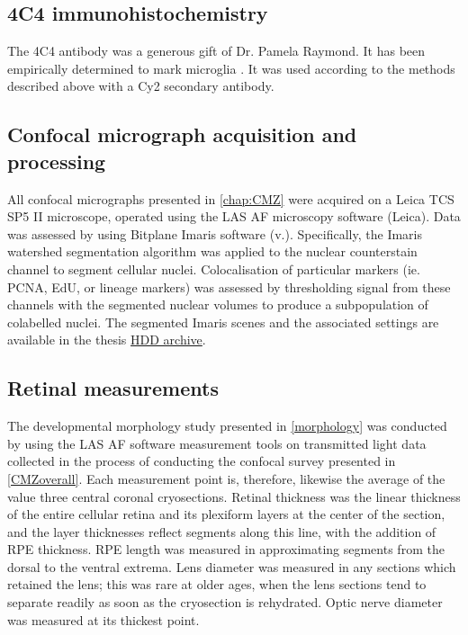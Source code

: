 \subsection{4C4 immunohistochemistry}
\label{ssec:CMZ4C4histo}
The 4C4 antibody was a generous gift of Dr. Pamela Raymond. It has been empirically determined to mark microglia \cite{Becker2001}. It was used according to the methods described above with a Cy2 secondary antibody.

\subsection{Confocal micrograph acquisition and processing}
All confocal micrographs presented in \autoref{chap:CMZ} were acquired on a Leica TCS SP5 II microscope, operated using the LAS AF microscopy software (Leica). Data was assessed by using Bitplane Imaris software (v.). Specifically, the Imaris watershed segmentation algorithm was applied to the nuclear counterstain channel to segment cellular nuclei. Colocalisation of particular markers (ie. PCNA, EdU, or lineage markers) was assessed by thresholding signal from these channels with the segmented nuclear volumes to produce a subpopulation of colabelled nuclei. The segmented Imaris scenes and the associated settings are available in the thesis \hyperref[archive]{HDD archive}.

\subsection{Retinal measurements}
\label{ssec:CMZretmeas}
The developmental morphology study presented in \autoref{morphology} was conducted by using the LAS AF software measurement tools on transmitted light data collected in the process of conducting the confocal survey presented in \autoref{CMZoverall}. Each measurement point is, therefore, likewise the average of the value three central coronal cryosections. Retinal thickness was the linear thickness of the entire cellular retina and its plexiform layers at the center of the section, and the layer thicknesses reflect segments along this line, with the addition of RPE thickness. RPE length was measured in approximating segments from the dorsal to the ventral extrema. Lens diameter was measured in any sections which retained the lens; this was rare at older ages, when the lens sections tend to separate readily as soon as the cryosection is rehydrated. Optic nerve diameter was measured at its thickest point.

